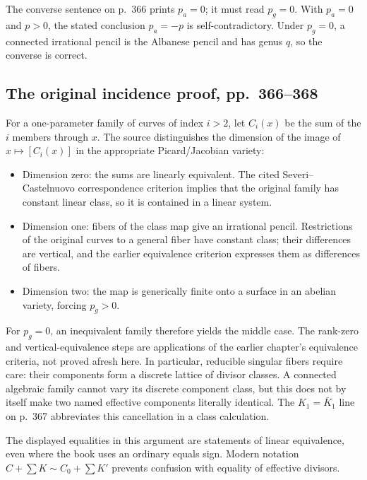 The converse sentence on p.~366 prints \(p_a=0\); it must read \(p_g=0\). With \(p_a=0\) and \(p>0\), the stated conclusion \(p_a=-p\) is self-contradictory. Under \(p_g=0\), a connected irrational pencil is the Albanese pencil and has genus \(q\), so the converse is correct.

\subsection{The original incidence proof, pp.~366--368}\label{cp2-ix-11-3}

For a one-parameter family of curves of index \(i>2\), let \(C_i(x)\) be the sum of the \(i\) members through \(x\). The source distinguishes the dimension of the image of \(x\mapsto[C_i(x)]\) in the appropriate Picard/Jacobian variety:

\begin{itemize}
\item Dimension zero: the sums are linearly equivalent. The cited Severi--Castelnuovo correspondence criterion implies that the original family has constant linear class, so it is contained in a linear system.
\item Dimension one: fibers of the class map give an irrational pencil. Restrictions of the original curves to a general fiber have constant class; their differences are vertical, and the earlier equivalence criterion expresses them as differences of fibers.
\item Dimension two: the map is generically finite onto a surface in an abelian variety, forcing \(p_g>0\).

\end{itemize}
For \(p_g=0\), an inequivalent family therefore yields the middle case. The rank-zero and vertical-equivalence steps are applications of the earlier chapter's equivalence criteria, not proved afresh here. In particular, reducible singular fibers require care: their components form a discrete lattice of divisor classes. A connected algebraic family cannot vary its discrete component class, but this does not by itself make two named effective components literally identical. The \(K_1=\bar K_1\) line on p.~367 abbreviates this cancellation in a class calculation.

The displayed equalities in this argument are statements of linear equivalence, even where the book uses an ordinary equals sign. Modern notation \(C+\sum K\sim C_0+\sum K'\) prevents confusion with equality of effective divisors.

